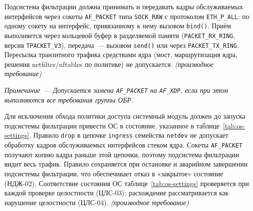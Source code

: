 \documentclass[12pt,a4paper,final]{article}
\newenvironment{reqs}
  {\begin{description}[style=sameline,leftmargin=2.2cm,labelwidth=2.0cm,
     labelsep=0.2cm,font=\normalfont\bfseries,itemsep=3pt]}
  {\end{description}}
\newcommand{\der}{\textit{(производное требование)}}
\begin{document}
\begin{reqs}
\item[ОБР-01] Подсистема фильтрации должна принимать и передавать кадры
  обслуживаемых интерфейсов через сокеты \texttt{AF\_PACKET} типа
  \texttt{SOCK\_RAW} с протоколом \texttt{ETH\_P\_ALL}: по одному сокету на
  интерфейс, привязанному к нему вызовом \texttt{bind()}. Приём выполняется
  через кольцевой буфер в разделяемой памяти (\texttt{PACKET\_RX\_RING},
  версия \texttt{TPACKET\_V3}), передача~— вызовом \texttt{send()} или через
  \texttt{PACKET\_TX\_RING}. Пересылка транзитного трафика средствами ядра
  (мост, маршрутизация ядра, решения netfilter/nftables по политике) не
  допускается. \der

  \textit{Примечание~— Допускается замена \texttt{AF\_PACKET} на
  \texttt{AF\_XDP}, если при этом выполняются все требования группы ОБР.}

\item[ОБР-02] Для исключения обхода политики доступа системный модуль должен
  до запуска подсистемы фильтрации привести ОС в состояние, указанное
  в таблице~\ref{tab:os-settings}. Правило \texttt{drop} в цепочке
  \texttt{ingress} семейства \texttt{netdev} не допускает обработку кадров
  обслуживаемых интерфейсов стеком ядра. Сокеты \texttt{AF\_PACKET} получают
  копию кадра раньше этой цепочки, поэтому подсистема фильтрации видит весь
  трафик. Правило сохраняется при остановке и аварийном завершении подсистемы
  фильтрации, что обеспечивает отказ в «закрытое» состояние (НДЖ-02).
  Соответствие состояния ОС таблице~\ref{tab:os-settings} проверяется при
  каждой проверке целостности (ЦЛС-03); расхождение рассматривается как
  нарушение целостности (ЦЛС-04). \der
\end{reqs}
\end{document}
